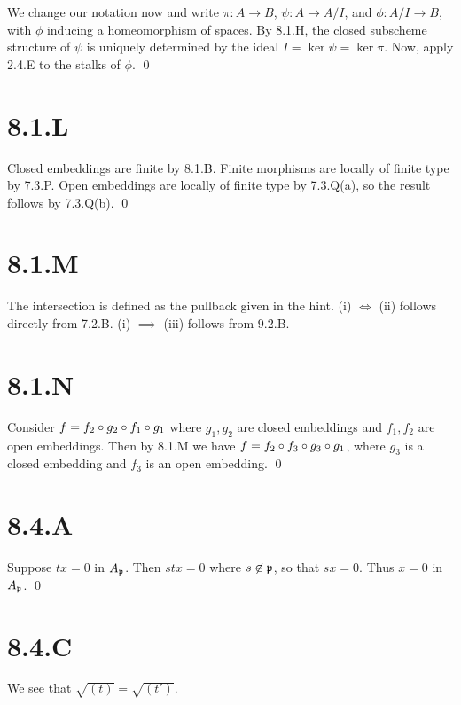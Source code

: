 \documentclass{article}
\begin{document}
We change our notation now and write $\pi: A \to B$,
$\psi: A \to A/I$, and $\phi: A/I \to B$, with $\phi$
inducing a homeomorphism of spaces. By 8.1.H, the closed subscheme structure of
$\psi$ is uniquely determined by the ideal
$I=\ker \psi = \ker \pi$. Now, apply 2.4.E to the stalks of
$\phi$. \qed

\section{8.1.L}
Closed embeddings are finite by 8.1.B. Finite morphisms are locally of finite
type by 7.3.P. Open embeddings are locally of finite type by 7.3.Q(a), so the
result follows by 7.3.Q(b). \qed

\section{8.1.M}
The intersection is defined as the pullback given in the hint. (i)
$\iff$ (ii) follows directly from 7.2.B. (i)
$\implies$ (iii) follows from 9.2.B.

\section{8.1.N}
Consider $f=f_2 \circ g_2 \circ f_1 \circ g_1$ where $g_1, g_2$ are closed
embeddings and $f_1, f_2$ are open embeddings. Then by 8.1.M we
have $f=f_2 \circ f_3 \circ g_3 \circ g_1$, where $g_3$ is a closed embedding
and $f_3$ is an open embedding. \qed

\section{8.4.A}
Suppose $tx=0$ in $A_{\mathfrak{p}}$. Then
$stx=0$ where $s \not \in \mathfrak{p}$, so that
$sx=0$. Thus $x=0$ in $A_{\mathfrak{p}}$.
\qed

\section{8.4.C}
We see that $\sqrt{(t)}=\sqrt{(t')}$.
\end{document}
